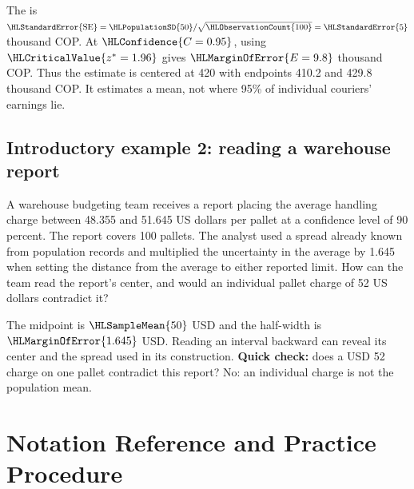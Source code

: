 The  is $\HLStandardError{\mathrm{SE}}=\HLPopulationSD{50}/\sqrt{\HLObservationCount{100}}=\HLStandardError{5}$ thousand COP. At $\HLConfidence{C=0.95}$, using $\HLCriticalValue{z^*=1.96}$ gives $\HLMarginOfError{E=9.8}$ thousand COP. Thus the estimate is centered at 420 with endpoints 410.2 and 429.8 thousand COP. It estimates a mean, not where 95\% of individual couriers' earnings lie.

\subsection{Introductory example 2: reading a warehouse report}\label{ex:intro-two}
A warehouse budgeting team receives a report placing the average handling charge between 48.355 and 51.645 US dollars per pallet at a confidence level of 90 percent. The report covers 100 pallets. The analyst used a spread already known from population records and multiplied the uncertainty in the average by 1.645 when setting the distance from the average to either reported limit. How can the team read the report's center, and would an individual pallet charge of 52 US dollars contradict it?

The midpoint is $\HLSampleMean{50}$ USD and the half-width is $\HLMarginOfError{1.645}$ USD. Reading an interval backward can reveal its center and the spread used in its construction. \textbf{Quick check:} does a USD 52 charge on one pallet contradict this report? No: an individual charge is not the population mean.

\clearpage
\section{Notation Reference and Practice Procedure}\label{sec:notation-and-procedure}
